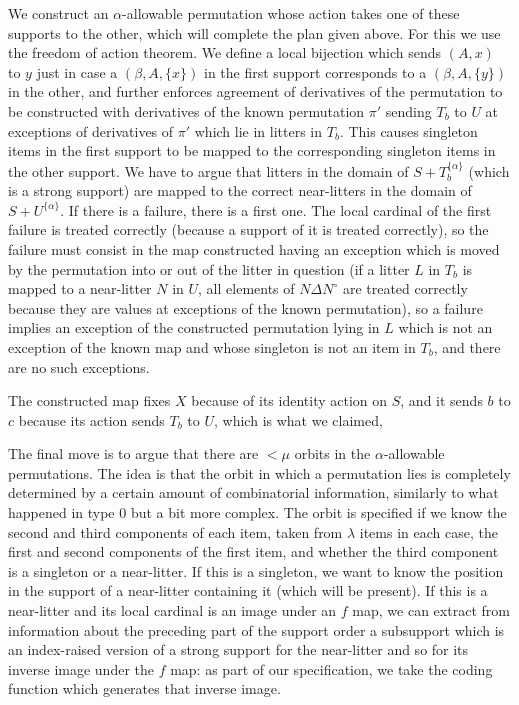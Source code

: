 We construct an $\alpha$-allowable permutation whose action takes one of these supports to the other, which will complete the plan given above.
For this we use the freedom of action theorem.  We define a local bijection which sends $(A,x)$ to $y$ just in case a $(\beta,A,\{x\})$ in the first support corresponds to a $(\beta,A,\{y\})$ in the other, and further enforces agreement of derivatives  of the permutation to be constructed with derivatives of the known permutation $\pi'$ sending $T_b$ to $U$ at exceptions of derivatives of $\pi'$ which lie in litters in $T_b$.  This causes singleton items in the first support to be mapped to the corresponding singleton items in the other support.  We have to argue that litters in the domain of $S+T_b^{\{\alpha\}}$ (which is a strong support) are mapped to the correct near-litters in the domain of $S+U^{\{\alpha\}}$.  If there is a failure, there is a first one.  The local cardinal of the first failure is treated correctly (because a support of it is treated correctly), so the failure must consist in the map constructed having an exception which is moved by the permutation into or out of the litter in question (if a litter $L$ in $T_b$ is mapped to a near-litter $N$ in $U$, all elements of $N \Delta N^\circ$ are treated correctly because they are values at exceptions of the known permutation), so a failure implies an exception of the constructed permutation lying in $L$ which is not an exception of the known map and whose singleton is not an item in $T_b$, and there are no such exceptions.

The constructed map fixes $X$ because of its identity action on $S$, and it sends $b$ to $c$ because its action sends $T_b$ to $U$, which is what we claimed,

The final move is to argue that there are $<\mu$ orbits in the $\alpha$-allowable permutations.  The idea is that the orbit in which a permutation lies
is completely determined by a certain amount of combinatorial information, similarly to what happened in type 0 but a bit more complex.  The orbit is specified if we know the second and third components of each item, taken from $\lambda$ items in each case, the first and second components of the first item, and whether the third component is a singleton or a near-litter.  If this is a singleton, we want to know the position in the support of a near-litter containing it (which will be present).  If this is a near-litter and its local cardinal is an image under an $f$ map, we can extract from information about the preceding part of the support order a subsupport which is an index-raised version of a strong support for the near-litter and so for its inverse image under the $f$ map:  as part of our specification, we take the coding function which generates that inverse image.

